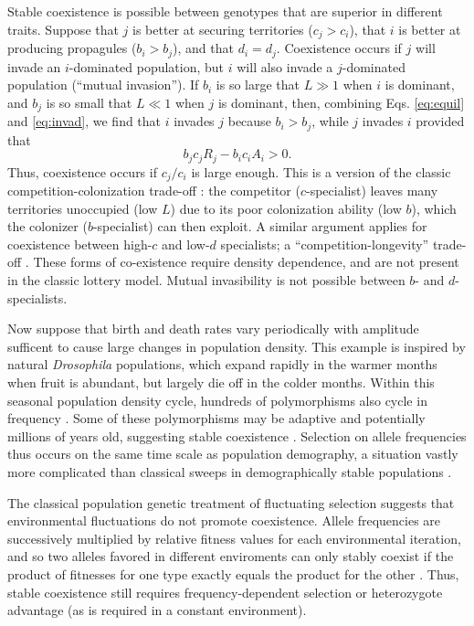 \documentclass[11pt]{article}
\begin{document}
Stable coexistence is possible between genotypes that are superior in different traits. Suppose that $j$ is better at securing territories ($c_j>c_i$), that $i$ is better at producing propagules ($b_i>b_j$), and that $d_i=d_j$. Coexistence occurs if $j$ will invade an $i$-dominated population, but $i$ will also invade a $j$-dominated population (``mutual invasion''). If $b_i$ is so large that $L\gg 1$ when $i$ is dominant, and $b_j$ is so small that $L\ll 1$ when $j$ is dominant, then, combining Eqs. \eqref{eq:equil} and \eqref{eq:invad}, we find that $i$ invades $j$ because $b_i>b_j$, while $j$ invades $i$ provided that
\begin{equation}
b_jc_jR_j-b_i c_i A_i>0. \label{eq:jinvadcoex}
\end{equation}
Thus, coexistence occurs if $c_j/c_i$ is large enough. This is a version of the classic competition-colonization trade-off \citep{tilman_94,levins_71}: the competitor ($c$-specialist) leaves many territories unoccupied (low $L$) due to its poor colonization ability (low $b$), which the colonizer ($b$-specialist) can then exploit. A similar argument applies for coexistence between high-$c$ and low-$d$ specialists; a ``competition-longevity'' trade-off \citep{tilman_94}. These forms of co-existence require density dependence, and are not present in the classic lottery model. Mutual invasibility is not possible between $b$- and $d$-specialists. 

Now suppose that birth and death rates vary periodically with amplitude sufficent to cause large changes in population density. This example is inspired by natural \textit{Drosophila} populations, which expand rapidly in the warmer months when fruit is abundant, but largely die off in the colder months. Within this seasonal population density cycle, hundreds of polymorphisms also cycle in frequency \citep{bergland_14}. Some of these polymorphisms may be adaptive and potentially millions of years old, suggesting stable coexistence \citep{bergland_14,messer_2016}. Selection on allele frequencies thus occurs on the same time scale as population demography, a situation vastly more complicated than classical sweeps in demographically stable populations \citep{messer_2016}.

The classical population genetic treatment of fluctuating selection suggests that environmental fluctuations do not promote coexistence. Allele frequencies are successively multiplied by relative fitness values for each environmental iteration, and so two alleles favored in different enviroments can only stably coexist if the product of fitnesses for one type exactly equals the product for the other \citep{dempster_1955}. Thus, stable coexistence still requires frequency-dependent selection or heterozygote advantage (as is required in a constant environment). 
\end{document}
